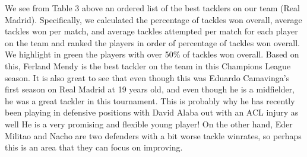 \documentclass[11pt]{report}
\begin{document}
\begin{itemize}
			We see from Table 3 above an ordered list of the best tacklers on our team (Real Madrid). Specifically, we calculated the percentage of tackles won overall, average tackles won per match, and average tackles attempted per match for each player on the team and ranked the players in order of percentage of tackles won overall. We highlight in green the players with over 50\% of tackles won overall. Based on this, Ferland Mendy is the best tackler on the team in this Champions League season. It is also great to see that even though this was Eduardo Camavinga's first season on Real Madrid at 19 years old, and even though he is a midfielder, he was a great tackler in this tournament. This is probably why he has recently been playing in defensive positions with David Alaba out with an ACL injury as well He is a very promising and flexible young player! On the other hand, Eder Militao and Nacho are two defenders with a bit worse tackle winrates, so perhaps this is an area that they can focus on improving.
	\end{itemize}
\end{document}
